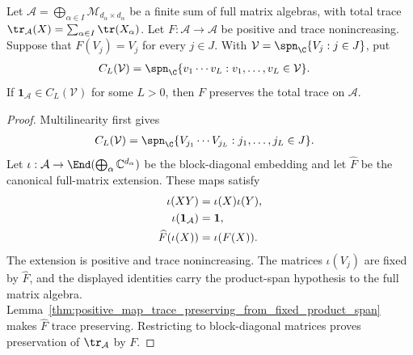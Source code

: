 \begin{lemma}
    \label{thm:positive_direct_sum_map_trace_preserving_from_fixed_product_span}
    \leanok
    Let
    $\mathcal A=\bigoplus_{\alpha\in I}\mathcal M_{d_\alpha\times d_\alpha}$
    be a finite sum of full matrix algebras, with total trace
    $\tr_{\mathcal A}(X)=\sum_{\alpha\in I}\tr(X_\alpha)$.
    Let $F:\mathcal A\to\mathcal A$ be positive and trace nonincreasing.
    Suppose that $F(V_j)=V_j$ for every $j\in J$. With
    $\mathcal V=\spn_{\C}\{V_j:j\in J\}$, put
    \begin{align}
        C_L(\mathcal V)
         & =\spn_{\C}\{v_1\cdots v_L:v_1,\ldots,v_L\in\mathcal V\}.
        \notag
    \end{align}
    If $\mathbf 1_{\mathcal A}\in C_L(\mathcal V)$ for some $L>0$, then $F$
    preserves the total trace on $\mathcal A$.
\end{lemma}

\begin{proof}\leanok
    Multilinearity first gives
    \begin{align}
        C_L(\mathcal V)
         & =\spn_{\C}\{V_{j_1}\cdots V_{j_L}:j_1,\ldots,j_L\in J\}.
        \notag
    \end{align}
    Let $\iota:\mathcal A\to\End(\bigoplus_\alpha
        \mathbb C^{d_\alpha})$ be the block-diagonal embedding and let
    $\widehat F$ be the canonical full-matrix extension. These maps satisfy
    \begin{align}
        \iota(XY)                     & =\iota(X)\iota(Y),
        \notag                                             \\
        \iota(\mathbf 1_{\mathcal A}) & =\mathbf 1,
        \notag                                             \\
        \widehat F(\iota(X))          & =\iota(F(X)).
        \notag
    \end{align}
    The extension is positive and trace nonincreasing. The matrices
    $\iota(V_j)$ are fixed by $\widehat F$, and the displayed identities
    carry the product-span hypothesis to the full matrix algebra.
    Lemma~\ref{thm:positive_map_trace_preserving_from_fixed_product_span}
    makes $\widehat F$ trace preserving. Restricting to block-diagonal
    matrices proves preservation of $\tr_{\mathcal A}$ by $F$.
\end{proof}

